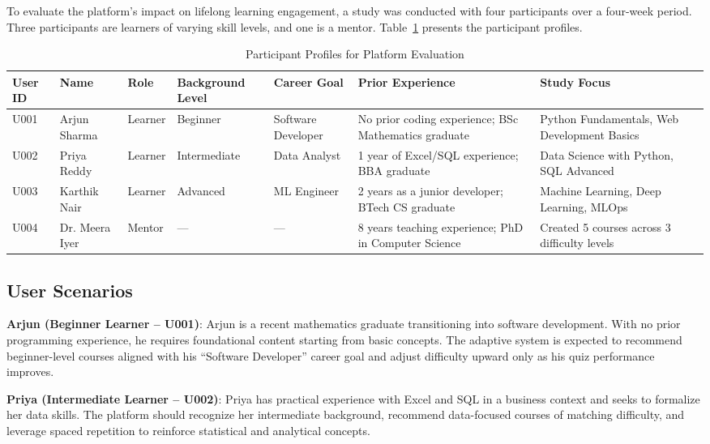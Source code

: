 \documentclass[conference]{IEEEtran}
\begin{document}
To evaluate the platform's impact on lifelong learning engagement, a study was conducted with four participants over a four-week period. Three participants are learners of varying skill levels, and one is a mentor. Table~\ref{tab:user_profiles} presents the participant profiles.

\begin{table}[htbp]
\caption{Participant Profiles for Platform Evaluation}
\label{tab:user_profiles}
\centering
\begin{tabular}{p{1.2cm}p{2.2cm}p{1.5cm}p{2.5cm}p{2.5cm}p{2.2cm}p{2.5cm}}
\toprule
\textbf{User ID} & \textbf{Name} & \textbf{Role} & \textbf{Background Level} & \textbf{Career Goal} & \textbf{Prior Experience} & \textbf{Study Focus} \\
\midrule
U001 & Arjun Sharma & Learner & Beginner & Software Developer & No prior coding experience; BSc Mathematics graduate & Python Fundamentals, Web Development Basics \\
U002 & Priya Reddy & Learner & Intermediate & Data Analyst & 1 year of Excel/SQL experience; BBA graduate & Data Science with Python, SQL Advanced \\
U003 & Karthik Nair & Learner & Advanced & ML Engineer & 2 years as a junior developer; BTech CS graduate & Machine Learning, Deep Learning, MLOps \\
U004 & Dr. Meera Iyer & Mentor & --- & --- & 8 years teaching experience; PhD in Computer Science & Created 5 courses across 3 difficulty levels \\
\bottomrule
\end{tabular}
\end{table}

\subsection{User Scenarios}

\textbf{Arjun (Beginner Learner -- U001)}: Arjun is a recent mathematics graduate transitioning into software development. With no prior programming experience, he requires foundational content starting from basic concepts. The adaptive system is expected to recommend beginner-level courses aligned with his ``Software Developer'' career goal and adjust difficulty upward only as his quiz performance improves.

\textbf{Priya (Intermediate Learner -- U002)}: Priya has practical experience with Excel and SQL in a business context and seeks to formalize her data skills. The platform should recognize her intermediate background, recommend data-focused courses of matching difficulty, and leverage spaced repetition to reinforce statistical and analytical concepts.
\end{document}
